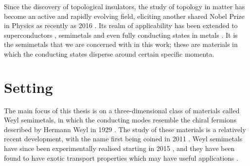 Since the discovery of topological insulators, the study of topology in matter has become an active and rapidly evolving field, eliciting another shared Nobel Prize in Physics as recently as 2016 \cite{Nobel_2016}. Its realm of applicability has been extended to superconductors \cite{Sato_superconductors}, semimetals \cite{Mathai_math-review} and even fully conducting states in metals \cite{Cheng_metals}. It is the semimetals that we are concerned with in this work; these are materials in which the conducting states disperse around certain specific momenta.

\section{Setting}

The main focus of this thesis is on a three-dimensional class of materials called Weyl semimetals, in which the conducting modes resemble the chiral fermions described by Hermann Weyl in 1929 \cite{Weyl_fermions}. The study of these materials is a relatively recent development, with the name first being coined in 2011 \cite{Wan_WSMs}. Weyl semimetals have since been experimentally realised starting in 2015 \cite{Xu_TaAs,Xu_TaAp,Yang-TaAs,Lv_WSM-TaAs}, and they have been found to have exotic transport properties which may have useful applications \cite{Shekhar_magnetoresistance,Osterhoudt_WSM-photovoltaic,Yang_WSM-photovoltaic}.

